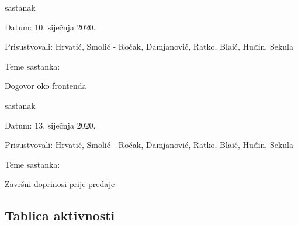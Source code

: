 \begin{packed_enum}
			\item sastanak
			
			\item[] \begin{packed_item}
				\item Datum: 10. siječnja 2020.
				\item Prisustvovali: Hrvatić, Smolić - Ročak, Damjanović, Ratko, Blaić, Huđin, Sekula
				\item Teme sastanka:
				\begin{packed_item}
				\item  Dogovor oko frontenda
				\end{packed_item}
			\end{packed_item}
			
			\item sastanak
			
			\item[] \begin{packed_item}
				\item Datum: 13. siječnja 2020.
				\item Prisustvovali: Hrvatić, Smolić - Ročak, Damjanović, Ratko, Blaić, Huđin, Sekula
				\item Teme sastanka:
				\begin{packed_item}
				\item  Završni doprinosi prije predaje
				\end{packed_item}
			\end{packed_item}
			
			
			
			
			
		\end{packed_enum}
		
		\eject
		\begin{flushleft}
				\section*{Tablica aktivnosti}
		\end{flushleft}
			
